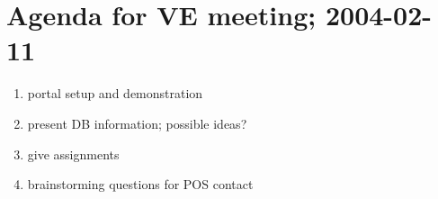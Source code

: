 \documentclass{article}
\begin{document}
\section{Agenda for VE meeting; 2004-02-11}
\begin{enumerate}
    \item portal setup and demonstration
    \item present DB information; possible ideas?
    \item give assignments
    \item brainstorming questions for POS contact
\end{enumerate}
\end{document}
